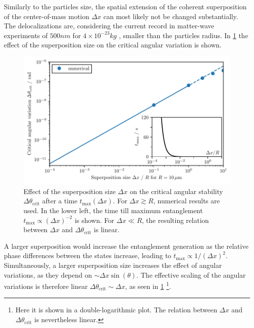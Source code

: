 Similarly to the particles size, the spatial extension of the coherent superposition of the center-of-mass motion $\Delta x$ can most likely not be changed substantially. The delocalizations are, considering the current record in matter-wave experiments of $500\si{nm}$ for $4\times 10^{-23}\si{kg}$ \cite{Fein_2019}, smaller than the particles radius. 
In \cref{fig:4:theta-crit-superposition-size} the effect of the superposition size on the critical angular variation is shown.
\begin{figure}[!htbp]
  \centering
  \includegraphics[width=\textwidth]{./../figures/theta-variance/theta-crit-superpos-size.pdf}
  \caption{Effect of the superposition size $\Delta x$ on the critical angular stability $\Delta \theta_\mathrm{crit}$ after a time $t_\mathrm{max}(\Delta x)$. For $\Delta x \gtrsim R$, numerical results are used. In the lower left, the time till maximum entanglement $t_\mathrm{max} \propto (\Delta x)^{-2}$ is shown. For $\Delta x \ll R$, the resulting relation between $\Delta x$ and $\Delta \theta_\mathrm{crit}$ is linear.}
  \label{fig:4:theta-crit-superposition-size}
\end{figure}
A larger superposition would increase the entanglement generation as the relative phase differences between the states increase, leading to $t_\mathrm{max} \propto 1/(\Delta x)^{2}$. 
Simultaneously, a larger superposition size increases the effect of angular variations, as they depend on $\sim \Delta x \sin(\theta)$.
The effective scaling of the angular variations is therefore linear $\Delta \theta_\mathrm{crit} \sim \Delta x$, as seen in \cref{fig:4:theta-crit-superposition-size} \footnote{Here it is shown in a double-logarithmic plot. The relation between $\Delta x$ and $\Delta \theta_\mathrm{crit}$ is nevertheless linear.}.



